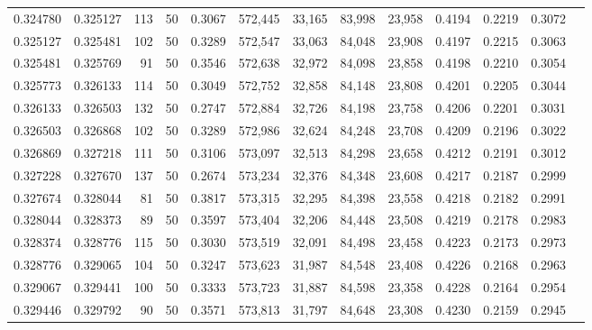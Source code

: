 \begin{tabular}{rrrrrrrrrrrrr}
0.324780 & 0.325127 &   113 &  50 &                                     0.3067 & 572,445 &  33,165 &  83,998 &  23,958 & 0.4194 & 0.2219 & 0.3072 \\
0.325127 & 0.325481 &   102 &  50 &                                     0.3289 & 572,547 &  33,063 &  84,048 &  23,908 & 0.4197 & 0.2215 & 0.3063 \\
0.325481 & 0.325769 &    91 &  50 &                                     0.3546 & 572,638 &  32,972 &  84,098 &  23,858 & 0.4198 & 0.2210 & 0.3054 \\
0.325773 & 0.326133 &   114 &  50 &                                     0.3049 & 572,752 &  32,858 &  84,148 &  23,808 & 0.4201 & 0.2205 & 0.3044 \\
0.326133 & 0.326503 &   132 &  50 &                                     0.2747 & 572,884 &  32,726 &  84,198 &  23,758 & 0.4206 & 0.2201 & 0.3031 \\
0.326503 & 0.326868 &   102 &  50 &                                     0.3289 & 572,986 &  32,624 &  84,248 &  23,708 & 0.4209 & 0.2196 & 0.3022 \\
0.326869 & 0.327218 &   111 &  50 &                                     0.3106 & 573,097 &  32,513 &  84,298 &  23,658 & 0.4212 & 0.2191 & 0.3012 \\
0.327228 & 0.327670 &   137 &  50 &                                     0.2674 & 573,234 &  32,376 &  84,348 &  23,608 & 0.4217 & 0.2187 & 0.2999 \\
0.327674 & 0.328044 &    81 &  50 &                                     0.3817 & 573,315 &  32,295 &  84,398 &  23,558 & 0.4218 & 0.2182 & 0.2991 \\
0.328044 & 0.328373 &    89 &  50 &                                     0.3597 & 573,404 &  32,206 &  84,448 &  23,508 & 0.4219 & 0.2178 & 0.2983 \\
0.328374 & 0.328776 &   115 &  50 &                                     0.3030 & 573,519 &  32,091 &  84,498 &  23,458 & 0.4223 & 0.2173 & 0.2973 \\
0.328776 & 0.329065 &   104 &  50 &                                     0.3247 & 573,623 &  31,987 &  84,548 &  23,408 & 0.4226 & 0.2168 & 0.2963 \\
0.329067 & 0.329441 &   100 &  50 &                                     0.3333 & 573,723 &  31,887 &  84,598 &  23,358 & 0.4228 & 0.2164 & 0.2954 \\
0.329446 & 0.329792 &    90 &  50 &                                     0.3571 & 573,813 &  31,797 &  84,648 &  23,308 & 0.4230 & 0.2159 & 0.2945 \\

\end{tabular}
